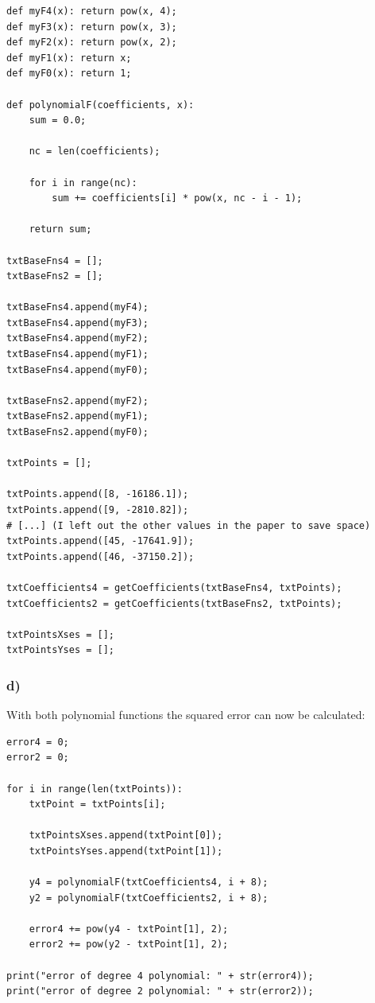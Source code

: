 \begin{lstlisting}[caption=Problem 5.10 c)]
def myF4(x): return pow(x, 4);
def myF3(x): return pow(x, 3);
def myF2(x): return pow(x, 2);
def myF1(x): return x;
def myF0(x): return 1;

def polynomialF(coefficients, x):
	sum = 0.0;
	
	nc = len(coefficients);
	
	for i in range(nc):
		sum += coefficients[i] * pow(x, nc - i - 1);
	
	return sum;

txtBaseFns4 = [];
txtBaseFns2 = [];

txtBaseFns4.append(myF4);
txtBaseFns4.append(myF3);
txtBaseFns4.append(myF2);
txtBaseFns4.append(myF1);
txtBaseFns4.append(myF0);

txtBaseFns2.append(myF2);
txtBaseFns2.append(myF1);
txtBaseFns2.append(myF0);

txtPoints = [];

txtPoints.append([8, -16186.1]);
txtPoints.append([9, -2810.82]);
# [...] (I left out the other values in the paper to save space)
txtPoints.append([45, -17641.9]);
txtPoints.append([46, -37150.2]);

txtCoefficients4 = getCoefficients(txtBaseFns4, txtPoints);
txtCoefficients2 = getCoefficients(txtBaseFns2, txtPoints);

txtPointsXses = [];
txtPointsYses = [];
\end{lstlisting}


\subsubsection{d)}

With both polynomial functions the squared error can now be calculated:

\begin{lstlisting}[caption=Calculating the squared errors of both polynomials]
error4 = 0;
error2 = 0;

for i in range(len(txtPoints)):
	txtPoint = txtPoints[i];
	
	txtPointsXses.append(txtPoint[0]);
	txtPointsYses.append(txtPoint[1]);
	
	y4 = polynomialF(txtCoefficients4, i + 8);
	y2 = polynomialF(txtCoefficients2, i + 8);
	
	error4 += pow(y4 - txtPoint[1], 2);
	error2 += pow(y2 - txtPoint[1], 2);

print("error of degree 4 polynomial: " + str(error4));
print("error of degree 2 polynomial: " + str(error2));
\end{lstlisting}

